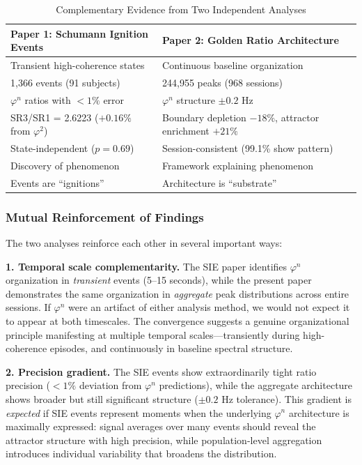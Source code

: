 \documentclass[11pt,a4paper]{article}
\newcommand{\phisym}{\varphi}
\begin{document}
\begin{table}[H]
\centering
\caption{Complementary Evidence from Two Independent Analyses}
\label{tab:paper_relationship}
\begin{tabular}{@{}ll@{}}
\toprule
Paper 1: Schumann Ignition Events & Paper 2: Golden Ratio Architecture \\
\midrule
Transient high-coherence states & Continuous baseline organization \\
1,366 events (91 subjects) & 244,955 peaks (968 sessions) \\
$\phisym^n$ ratios with $<1\%$ error & $\phisym^n$ structure $\pm 0.2$ Hz \\
SR3/SR1 = 2.6223 ($+0.16\%$ from $\phisym^2$) & Boundary depletion $-18\%$, attractor enrichment $+21\%$ \\
State-independent ($p = 0.69$) & Session-consistent (99.1\% show pattern) \\
Discovery of phenomenon & Framework explaining phenomenon \\
Events are ``ignitions'' & Architecture is ``substrate'' \\
\bottomrule
\end{tabular}
\end{table}

\subsubsection{Mutual Reinforcement of Findings}

The two analyses reinforce each other in several important ways:

\textbf{1. Temporal scale complementarity.} The SIE paper identifies $\phisym^n$ organization in \textit{transient} events (5--15 seconds), while the present paper demonstrates the same organization in \textit{aggregate} peak distributions across entire sessions. If $\phisym^n$ were an artifact of either analysis method, we would not expect it to appear at both timescales. The convergence suggests a genuine organizational principle manifesting at multiple temporal scales---transiently during high-coherence episodes, and continuously in baseline spectral structure.

\textbf{2. Precision gradient.} The SIE events show extraordinarily tight ratio precision ($<1\%$ deviation from $\phisym^n$ predictions), while the aggregate architecture shows broader but still significant structure ($\pm 0.2$ Hz tolerance). This gradient is \textit{expected} if SIE events represent moments when the underlying $\phisym^n$ architecture is maximally expressed: signal averages over many events should reveal the attractor structure with high precision, while population-level aggregation introduces individual variability that broadens the distribution.
\end{document}
